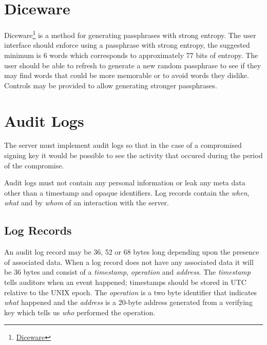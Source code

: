 \documentclass[a4paper,titlepage,oneside]{article}
\renewcommand{\paragraph}{\small}
\begin{document}
\section{Diceware}

\paragraph{Diceware\footnote{\href{https://en.wikipedia.org/wiki/Diceware}{Diceware}} is a method for generating passphrases with strong entropy. The user interface should enforce using a passphrase with strong entropy, the suggested minimum is 6 words which corresponds to approximately 77 bits of entropy. The user should be able to refresh to generate a new random passphrase to see if they may find words that could be more memorable or to avoid words they dislike. Controls may be provided to allow generating stronger passphrases.}

\section{Audit Logs}

\paragraph{The server must implement audit logs so that in the case of a compromised signing key it would be possible to see the activity that occured during the period of the compromise.}

\paragraph{Audit logs must not contain any personal information or leak any meta data other than a timestamp and opaque identifiers. Log records contain the \emph{when}, \emph{what} and by \emph{whom} of an interaction with the server.}

\subsection{Log Records}

\paragraph{An audit log record may be 36, 52 or 68 bytes long depending upon the presence of associated data. When a log record does not have any associated data it will be 36 bytes and consist of a \emph{timestamp}, \emph{operation} and \emph{address}. The \emph{timestamp} tells auditors when an event happened; timestamps should be stored in UTC relative to the UNIX epoch. The \emph{operation} is a two byte identifier that indicates \emph{what} happened and the \emph{address} is a 20-byte address generated from a verifying key which tells us \emph{who} performed the operation.}
\end{document}
